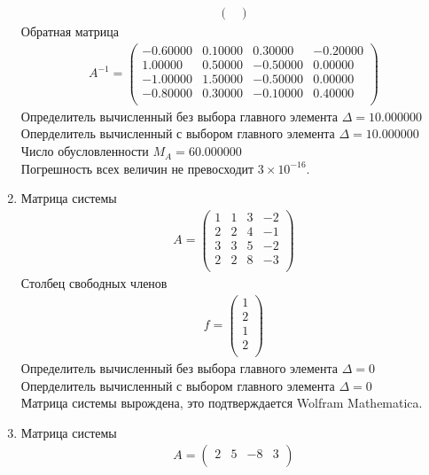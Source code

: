 \documentclass[a4paper,12pt,titlepage,finall]{article}
\begin{document}
\begin{enumerate}
\begin{align*}
\begin{pmatrix}
\end{pmatrix}
\end{align*}
Обратная матрица
\begin{align*}
A^{-1} = \begin{pmatrix}
-0.60000&     0.10000&     0.30000&    -0.20000 \\
   1.00000&     0.50000&    -0.50000&     0.00000 \\
  -1.00000&     1.50000&    -0.50000&     0.00000 \\
  -0.80000&     0.30000&    -0.10000&     0.40000 \\
\end{pmatrix}
\end{align*}
Определитель вычисленный без выбора главного элемента  $\Delta = 10.000000$\\
Оперделитель вычисленный с выбором главного элемента $\Delta = 10.000000$\\
Число обусловленности $M_A = 60.000000$\\
Погрешность всех величин не превосходит $3 \times 10^{-16}$.
\item
Матрица системы
\begin{align*}
A = \begin{pmatrix}
1&     1&     3&    -2 \\
   2&     2&     4&    -1 \\
   3&     3&     5&    -2 \\
   2&     2&     8&    -3 \\
\end{pmatrix}
\end{align*}
Столбец свободных членов
\begin{align*}
f = \begin{pmatrix}
1 \\
2 \\
1 \\
2 \\
\end{pmatrix}
\end{align*}
Определитель вычисленный без выбора главного элемента  $\Delta = 0$\\
Оперделитель вычисленный с выбором главного элемента $\Delta = 0$\\
Матрица системы вырождена, это подтверждается Wolfram Mathematica.
\item
Матрица системы
\begin{align*}
A = \begin{pmatrix}
2&           5&          -8&           3 \\

\end{pmatrix}
\end{align*}
\end{enumerate}
\end{document}
